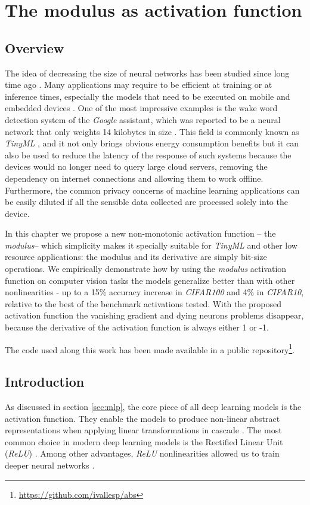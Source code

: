 \chapter{The modulus as activation function} \label{ch:modulus}

\section{Overview}
The idea of decreasing the size of neural networks has been studied since long time ago \autocite{lecun1989, hassibi1993, frankleC19}. Many applications may require to be efficient at training or at inference times, especially the models that need to be executed on mobile and embedded devices \autocite{ooko2021, zapico2021}. One of the most impressive examples is the wake word detection system of the \textit{Google} assistant, which was reported to be a neural network that only weights 14 kilobytes in size \autocite{warden2020}. This field is commonly known as \textit{TinyML} \autocite{han2022}, and it not only brings obvious energy consumption benefits but it can also be used to reduce the latency of the response of such systems because the devices would no longer need to query large cloud servers, removing the dependency on internet connections and allowing them to work offline. Furthermore, the common privacy concerns of machine learning applications \autocite{ha2019} can be easily diluted if all the sensible data collected are processed solely into the device.

In this chapter we propose a new non-monotonic activation function -- the \textit{modulus}-- which simplicity makes it specially suitable for \textit{TinyML} and other low resource applications: the modulus and its derivative are simply bit-size operations. We empirically demonstrate how by using the \textit{modulus} activation function on computer vision tasks the models generalize better than with other nonlinearities - up to a 15\% accuracy increase in \textit{CIFAR100} and 4\% in \textit{CIFAR10}, relative to the best of the benchmark activations tested. With the proposed activation function the vanishing gradient and dying neurons problems disappear, because the derivative of the activation function is always either 1 or -1.



The code used along this work has been made available in a public repository\footnote{\url{https://github.com/ivallesp/abs}}.


\section{Introduction}
As discussed in section \ref{sec:mlp}, the core piece of all deep learning models is the activation function. They enable the models to produce non-linear abstract representations when applying linear transformations in cascade \autocite{Goodfellow2016}. The most common choice in modern deep learning models is the Rectified Linear Unit (\textit{ReLU}) \autocite{nair2010}. Among other advantages, \textit{ReLU} nonlinearities allowed us to train deeper neural networks \autocite{xu2015}.

